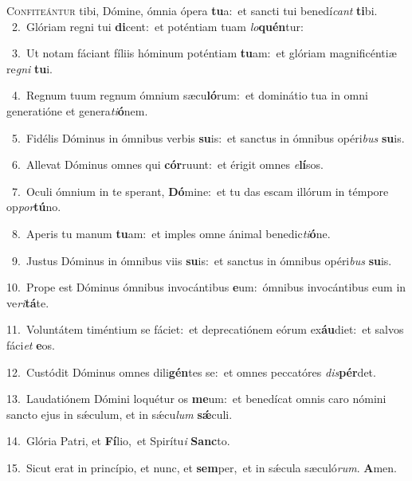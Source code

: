 \lettrine{\initial\textcolor{\initialcolor}{C}}{onfiteántur} tibi, Dómine, ómnia ópera \textbf{tu}\-a:~\star et sancti tui benedí\textit{cant} \textbf{ti}\-bi.\\
{\numbfont\textcolor{\numbcolor}{~2.}}~Glóriam regni tui \textbf{di}\-cent:~\star et poténtiam tuam \textit{lo}\-\textbf{quén}tur:\par
{\numbfont\textcolor{\numbcolor}{~3.}}~Ut notam fáciant fíliis hóminum poténtiam \textbf{tu}\-am:~\star et glóriam magnificéntiæ re\textit{gni} \textbf{tu}\-i.\par
{\numbfont\textcolor{\numbcolor}{~4.}}~Regnum tuum regnum ómnium sæcu\-\textbf{ló}\-rum:~\star et dominátio tua in omni generatióne et genera\-\textit{ti}\-\textbf{ó}nem.\par
{\numbfont\textcolor{\numbcolor}{~5.}}~Fidélis Dóminus in ómnibus verbis \textbf{su}\-is:~\star et sanctus in ómnibus opéri\textit{bus} \textbf{su}\-is.\par
{\numbfont\textcolor{\numbcolor}{~6.}}~Allevat Dóminus omnes qui \textbf{cór}\-ruunt:~\star et érigit omnes \textit{e}\-\textbf{lí}sos.\par
{\numbfont\textcolor{\numbcolor}{~7.}}~Oculi ómnium in te sperant, \textbf{Dó}\-mine:~\star et tu das escam illórum in témpore op\-\textit{por}\-\textbf{tú}no.\par
{\numbfont\textcolor{\numbcolor}{~8.}}~Aperis tu manum \textbf{tu}\-am:~\star et imples omne ánimal benedic\-\textit{ti}\-\textbf{ó}ne.\par
{\numbfont\textcolor{\numbcolor}{~9.}}~Justus Dóminus in ómnibus viis \textbf{su}\-is:~\star et sanctus in ómnibus opéri\textit{bus} \textbf{su}\-is.\par
{\numbfont\textcolor{\numbcolor}{10.}}~Prope est Dóminus ómnibus invocántibus \textbf{e}\-um:~\star ómnibus invocántibus eum in ve\-\textit{ri}\-\textbf{tá}te.\par
{\numbfont\textcolor{\numbcolor}{11.}}~Voluntátem timéntium se fáciet:~\dagger et deprecatiónem eórum ex\-\textbf{áu}\-diet:~\star et salvos fáci\textit{et} \textbf{e}\-os.\par
{\numbfont\textcolor{\numbcolor}{12.}}~Custódit Dóminus omnes dili\-\textbf{gén}\-tes se:~\star et omnes peccatóres \textit{dis}\-\textbf{pér}det.\par
{\numbfont\textcolor{\numbcolor}{13.}}~Laudatiónem Dómini loquétur os \textbf{me}\-um:~\star et benedícat omnis caro nómini sancto ejus in sǽculum, et in sǽcu\textit{lum} \textbf{sǽ}\-culi.\par
{\numbfont\textcolor{\numbcolor}{14.}}~Glória Patri, et \textbf{Fí}\-lio,~\star et Spirítu\textit{i} \textbf{Sanc}\-to.\par
{\numbfont\textcolor{\numbcolor}{15.}}~Sicut erat in princípio, et nunc, et \textbf{sem}\-per,~\star et in sǽcula sæculó\-\textit{rum}\-. \textbf{A}\-men.\par
